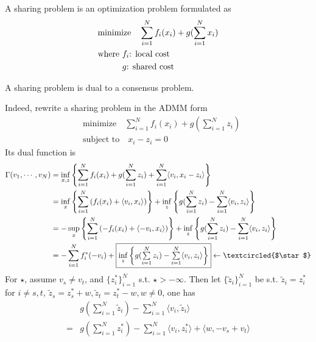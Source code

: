 A sharing problem is an optimization problem formulated as
\begin{align*}
    & \text{minimize} \quad \sum\limits_{i=1}^N f_i(x_i) + g(\sum\limits_{i=1}^N x_i) \\
    & \text{where $f_i$: local cost} \\
    & \text{\phantom{where }$g$: shared cost}
\end{align*}

\begin{remark}
A sharing problem is dual to a consensus problem.
\end{remark}

Indeed, rewrite a sharing problem in the ADMM form
\begin{align*}
    & \text{minimize} \quad \sum\limits_{i=1}^N f_i(x_i) + g(\sum\limits_{i=1}^N z_i) \\
    & \text{subject to} \quad x_i - z_i = 0
\end{align*}
Its dual function is
\begin{align*}
    \Gamma(v_1,\cdots,v_N) & = \inf\limits_{x,z} \left\{ \sum\limits_{i=1}^N f_i(x_i) + g(\sum\limits_{i=1}^N z_i) + \sum\limits_{i=1}^N \langle v_i, x_i-z_i \rangle \right\} \\
    & = \inf\limits_{x} \left\{ \sum\limits_{i=1}^N \left( f_i(x_i) + \langle v_i, x_i \rangle \right) \right\} + \inf\limits_{z} \left\{ g(\sum\limits_{i=1}^N z_i) - \sum\limits_{i=1}^N \langle v_i, z_i \rangle \right\} \\
    & = -\sup\limits_{x} \left\{ \sum\limits_{i=1}^N \left( -f_i(x_i) + \langle -v_i, x_i \rangle \right) \right\} + \inf\limits_{z} \left\{ g(\sum\limits_{i=1}^N z_i) - \sum\limits_{i=1}^N \langle v_i, z_i \rangle \right\} \\
    & = -\sum\limits_{i=1}^N f_i^*(-v_i) + \framebox{$\inf\limits_{z} \left\{ g(\sum\limits_{i=1}^N z_i) - \sum\limits_{i=1}^N \langle v_i, z_i \rangle \right\}$} \leftarrow \textcircled{$\star$}
\end{align*}
For \textcircled{$\star$}, assume $v_s\neq v_t$, and $\{z_i^*\}_{i=1}^N$ s.t. \textcircled{$\star$}$>-\infty$. Then let $\{\widetilde{z}_i\}_{i=1}^N$ be s.t. $\widetilde{z}_i = z_i^*$ for $i\neq s,t$, $\widetilde{z}_s = z_s^* + w, \widetilde{z}_t = z_t^* - w, w\neq 0$, one has
\begin{align*}
    & g(\sum\limits_{i=1}^N \widetilde{z}_i) - \sum\limits_{i=1}^N \langle v_i, \widetilde{z}_i \rangle \\
    = & g(\sum\limits_{i=1}^N z_i^*) - \sum\limits_{i=1}^N \langle v_i, z_i^* \rangle + \langle w, -v_s+v_t \rangle
\end{align*}
